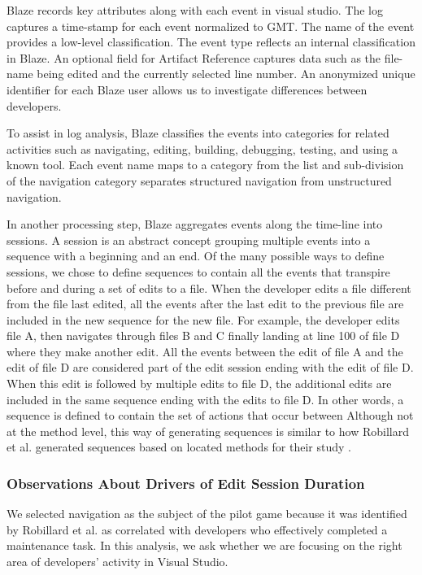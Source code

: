 \documentclass{sig-alternate}
\begin{document}
Blaze records key attributes along with each event in visual studio.  The log captures a time-stamp for each event normalized to GMT.  The name of the event provides a low-level classification.  The event type reflects an internal classification in Blaze.  An optional field for Artifact Reference captures data such as the file-name being edited and the currently selected line number.  An anonymized unique identifier for each Blaze user allows us to investigate differences between developers.

To assist in log analysis, Blaze classifies the events into categories for related activities such as navigating, editing, building, debugging,  testing, and using a  known tool.  Each event name maps to a category from the list and sub-division of the navigation category separates structured navigation from unstructured navigation.

In another processing step, Blaze aggregates events along the time-line into sessions.  A session is an abstract concept grouping multiple events into a sequence with a beginning and an end.  Of the many possible ways to define sessions, we chose to define sequences to contain all the events that transpire before and during a set of edits to a file.  When the developer edits a file different from the file last edited, all the events after the last edit to the previous file are included in the new sequence for the new file.  For example, the developer edits file A, then navigates through files B and C finally landing at line 100 of file D where they make another edit.  All the events between the edit of file A and the edit of file D are considered part of the edit session ending with the edit of file D.  When this edit is followed by multiple edits to file D, the additional edits are included in the same sequence ending with the edits to file D.  In other words, a sequence is defined to contain the set of actions that occur between  Although not at the method level, this way of generating sequences is similar to how Robillard et al. generated sequences based on located methods for their study \cite{wbsnipes:Robillard2004How}.

\subsubsection{Observations About Drivers of Edit Session Duration}
\label{sec:driversOfEditSession}
We selected navigation as the subject of the pilot game because it was identified by Robillard et al.\cite{wbsnipes:Robillard2004How} as correlated with developers who effectively completed a maintenance task.    In this analysis, we ask whether we are focusing on the right area of developers' activity in Visual Studio.
\end{document}

